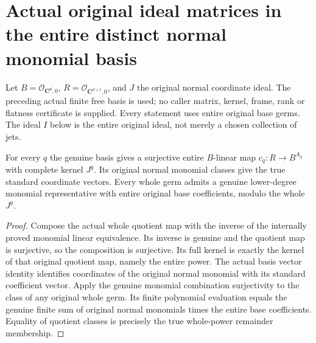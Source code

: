 \section{Actual original ideal matrices in the entire distinct normal monomial basis}
Let $B=\mathcal O_{\mathbf C^d,0}$, $R=\mathcal O_{\mathbf C^{d+t},0}$, and
$J$ the original normal coordinate ideal. The preceding actual finite free
basis is used; no caller matrix, kernel, frame, rank or flatness certificate
is supplied. Every statement uses entire original base germs. The ideal $I$
below is the entire original ideal, not merely a chosen collection of jets.

\begin{lemma}
\label{hir:relative-normal-ideal-actual-coordinates}
\leanok
For every $q$ the genuine basis gives a surjective entire $B$-linear map
$c_q:R\longrightarrow B^{A_q}$ with complete kernel $J^q$. Its original
normal monomial classes give the true standard coordinate vectors. Every
whole germ admits a genuine lower-degree monomial representative with
entire original base coefficients, modulo the whole $J^q$.
\end{lemma}
\begin{proof}
Compose the actual whole quotient map with the inverse of the internally
proved monomial linear equivalence. Its inverse is genuine and the quotient
map is surjective, so the composition is surjective. Its full kernel is
exactly the kernel of that original quotient map, namely the entire power.
The actual basis vector identity identifies coordinates of the original
normal monomial with its standard coefficient vector. Apply the genuine
monomial combination surjectivity to the class of any original whole germ.
Its finite polynomial evaluation equals the genuine finite sum of original
normal monomials times the entire base coefficients. Equality of quotient
classes is precisely the true whole-power remainder membership.
\end{proof}

